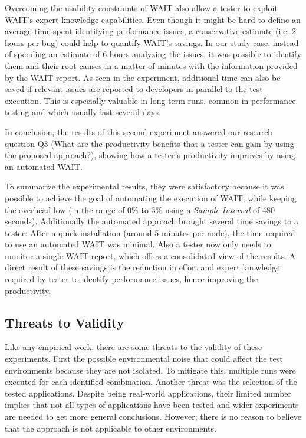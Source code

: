 \documentclass[runningheads,a4paper]{llncs}
\begin{document}
Overcoming the usability constraints of WAIT also allow a tester to exploit
WAIT's expert knowledge capabilities. Even though it might be hard to define an
average time spent identifying performance issues, a conservative estimate (i.e.
2 hours per bug) could help to quantify WAIT's savings. In our study case,
instead of spending an estimate of 6 hours analyzing the issues, it was possible to
identify them and their root causes in a matter of minutes with the information
provided by the WAIT report. As seen in the experiment, additional time can also
be saved if relevant issues are reported to developers in parallel to the test
execution. This is especially valuable in long-term runs, common in performance
testing and which usually last several days.

In conclusion, the results of this second experiment answered our research
question Q3 (What are the productivity benefits that a tester can gain by using the
proposed approach?), showing how a tester's productivity improves by using an
automated WAIT.

To summarize the experimental results, they were satisfactory because it
was possible to achieve the goal of automating the execution of WAIT,
while keeping the overhead low (in the range of 0\% to 3\% using a \emph{Sample
Interval} of 480 seconds). Additionally the automated approach brought several
time savings to a tester: After a quick installation (around 5 minutes per node), the
time required to use an automated WAIT was minimal. Also a tester now only
needs to monitor a single WAIT report, which offers a consolidated view of the
results. A direct result of these savings is the reduction in effort and expert
knowledge required by tester to identify performance issues, hence improving the
productivity.

\vspace{-5pt}
\subsection{Threats to Validity}
\vspace{-5pt}
Like any empirical work, there are some threats to the validity of these
experiments. First the possible environmental noise that could affect the test
environments because they are not isolated. To mitigate this, multiple runs were
executed for each identified combination. Another threat was the selection of
the tested applications. Despite being real-world applications, their limited
number implies that not all types of applications have been tested and wider
experiments are needed to get more general conclusions. However, there is no
reason to believe that the approach is not applicable to other environments.
\end{document}
